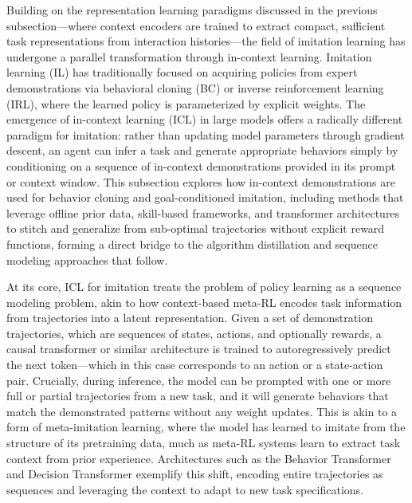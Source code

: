 \documentclass[11pt]{article}
\begin{document}
Building on the representation learning paradigms discussed in the previous subsection---where context encoders are trained to extract compact, sufficient task representations from interaction histories---the field of imitation learning has undergone a parallel transformation through in-context learning. Imitation learning (IL) has traditionally focused on acquiring policies from expert demonstrations via behavioral cloning (BC) or inverse reinforcement learning (IRL), where the learned policy is parameterized by explicit weights. The emergence of in-context learning (ICL) in large models offers a radically different paradigm for imitation: rather than updating model parameters through gradient descent, an agent can infer a task and generate appropriate behaviors simply by conditioning on a sequence of in-context demonstrations provided in its prompt or context window. This subsection explores how in-context demonstrations are used for behavior cloning and goal-conditioned imitation, including methods that leverage offline prior data, skill-based frameworks, and transformer architectures to stitch and generalize from sub-optimal trajectories without explicit reward functions, forming a direct bridge to the algorithm distillation and sequence modeling approaches that follow.

At its core, ICL for imitation treats the problem of policy learning as a sequence modeling problem, akin to how context-based meta-RL encodes task information from trajectories into a latent representation. Given a set of demonstration trajectories, which are sequences of states, actions, and optionally rewards, a causal transformer or similar architecture is trained to autoregressively predict the next token---which in this case corresponds to an action or a state-action pair. Crucially, during inference, the model can be prompted with one or more full or partial trajectories from a new task, and it will generate behaviors that match the demonstrated patterns without any weight updates. This is akin to a form of meta-imitation learning, where the model has learned to imitate from the structure of its pretraining data, much as meta-RL systems learn to extract task context from prior experience. Architectures such as the Behavior Transformer and Decision Transformer exemplify this shift, encoding entire trajectories as sequences and leveraging the context to adapt to new task specifications.
\end{document}
